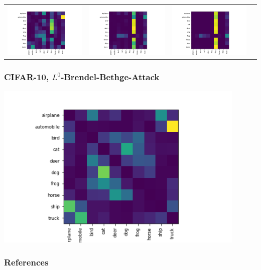 \documentclass[10pt,usepdftitle=false,aspectratio=169]{beamer}
\begin{document}
\begin{frame}
\begin{tabular}{cccc}
		\includegraphics[align=c,width=0.3\columnwidth]{../code/results/CIFAR-10/figures/LinfPGD, epsilon=0.2.png} &
		\includegraphics[align=c,width=0.3\columnwidth]{../code/results/CIFAR-10/figures/LinfPGD, epsilon=0.5.png} &
		\includegraphics[align=c,width=0.3\columnwidth]{../code/results/CIFAR-10/figures/LinfPGD, epsilon=1.png} &
	\end{tabular}
\end{frame}

\begin{frame}
	\frametitle{CIFAR-10, $L^0$-Brendel-Bethge-Attack}
		
		\includegraphics[align=c,width=0.9\textwidth]{../code/results/CIFAR-10/figures/L0BrendelBethgeAttack.png}
\end{frame}

\begin{frame}[allowframebreaks]
	\frametitle{References}
	
	
\end{frame}
\end{document}
